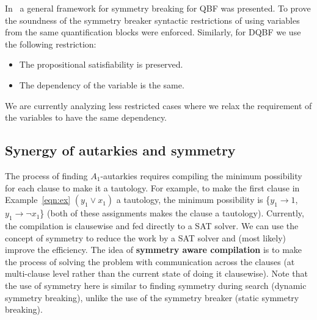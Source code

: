 \documentclass[conference]{IEEEtran}
\begin{document}
In~\cite{kauers2018symmetries} a general framework for symmetry breaking for QBF was presented. To prove the soundness of the symmetry breaker syntactic restrictions of using variables from the same quantification blocks were enforced.
%
Similarly, for DQBF we use the following restriction:
\begin{itemize}
	\item The propositional satisfiability is preserved.
	\item The dependency of the variable is the same. 
\end{itemize}

We are currently analyzing less restricted cases where we relax the requirement of the variables to have the same dependency. 

%


\subsection{Synergy of autarkies and symmetry}

The process of finding $A_{1}$-autarkies requires compiling the minimum possibility for each clause to make it a tautology.
%
For example, to make the first clause in Example~\ref{eqn:ex} $(y_1 \lor x_1)$ a tautology, the minimum possibility is \{$y_1 \to 1$, $y_1 \to \neg x_1$\} (both of these assignments makes the clause a tautology).
%
Currently, the compilation is clausewise and fed directly to a SAT solver.
%
We can use the concept of symmetry to reduce the work by a SAT solver and (most likely) improve the efficiency.
%
The idea of \textbf{symmetry aware compilation} is to make the process of solving the problem with communication across the clauses (at multi-clause level rather than the current state of doing it clausewise).
%
%
Note that the use of symmetry here is similar to finding symmetry during search (dynamic symmetry breaking), unlike the use of the symmetry breaker (static symmetry breaking). 
 
\end{document}
